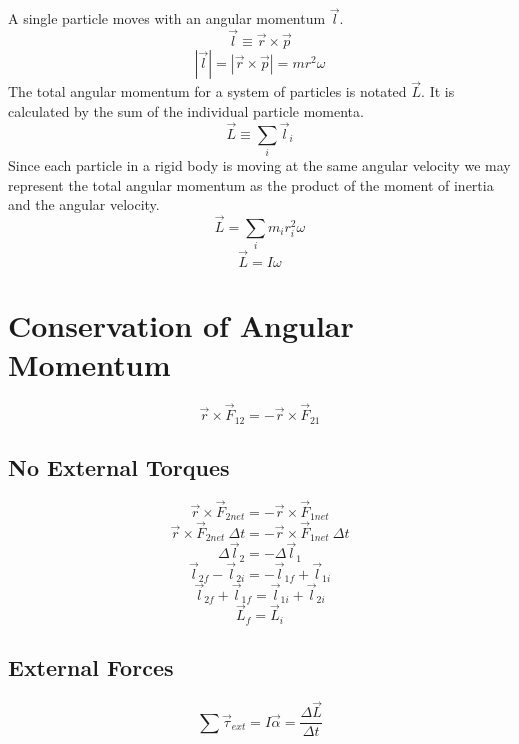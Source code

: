 A single particle moves with an angular momentum $\overrightarrow{l}$.
 $$\overrightarrow{l}\equiv \overrightarrow{r}\times  \overrightarrow{p}$$
 $$\left|\overrightarrow{l}\right|= \left|\overrightarrow{r}\times  \overrightarrow{p}\right|=mr^2\omega$$
 The total angular momentum for a system of particles is notated $\overrightarrow{L}$.  It is calculated by the sum of the individual particle momenta.
  $$\overrightarrow{L}\equiv \sum_i \overrightarrow{l}_i $$
  Since each particle in a rigid body is moving at the same angular velocity we may represent the total angular momentum as the product of the moment of inertia and the angular velocity.
  $$\overrightarrow{L}= \sum_i m_ir_i^2\omega$$
  $$\overrightarrow{L}= I\omega$$

\newpage
  
  \section{Conservation of Angular Momentum}
$$\overrightarrow{r}\times\overrightarrow{F}_{12}=-\overrightarrow{r}\times\overrightarrow{F}_{21}$$
\subsection{No External Torques}
$$\overrightarrow{r}\times\overrightarrow{F}_{2net}=-\overrightarrow{r}\times\overrightarrow{F}_{1net}$$
$$ \overrightarrow{r}\times\overrightarrow{F}_{2net}\ \Delta t=-\overrightarrow{r}\times\overrightarrow{F}_{1net}\ \Delta t$$
$$\Delta \overrightarrow{l}_{2}=-\Delta \overrightarrow{l}_{1}$$
$$\overrightarrow{l}_{2f} -\overrightarrow{l}_{2i}=-\overrightarrow{l}_{1f} +\overrightarrow{l}_{1i}$$
$$\overrightarrow{l}_{2f} +\overrightarrow{l}_{1f}=\overrightarrow{l}_{1i} +\overrightarrow{l}_{2i}$$
$$\overrightarrow{L}_{f}=\overrightarrow{L}_{i} $$
\subsection{External Forces}
$$\sum{ \overrightarrow{\tau}_{ext}}=I\overrightarrow{\alpha}=\frac{\Delta\overrightarrow{L}}{\Delta t}$$
 


